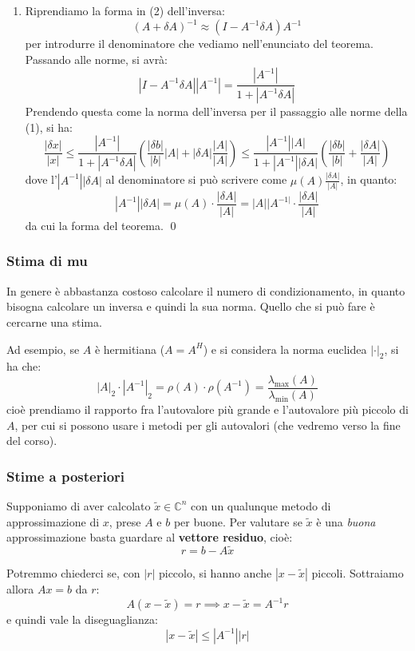 \documentclass[a4paper,11pt]{article}
\begin{document}
\begin{enumerate}
\item 
Riprendiamo la forma in (2) dell'inversa:
$$
(A + \delta A)^{-1} \approx (I - A^{-1} \delta A ) A^{-1} 
$$
per introdurre il denominatore che vediamo nell'enunciato del teorema.
Passando alle norme, si avrà:
$$
|I - A^{-1} \delta A| |A^{-1}| = \frac{|A^{-1}|}{1 + |A^{-1} \delta A|}
$$
Prendendo questa come la norma dell'inversa per il passaggio alle norme della (1), si ha:
$$
\frac{|\delta x|}{|x|} \leq \frac{|A^{-1}|}{1 + |A^{-1} \delta A|} \left( \frac{|\delta b|}{|b|} |A| + |\delta A| \frac{|A|}{|A|} \right) \leq \frac{ |A^{-1}| |A| }{ 1 + |A^{-1}| |\delta A| } \left( \frac{|\delta b|}{|b|} + \frac{|\delta A|}{|A|} \right)
$$
dove l'$|A^{-1}| |\delta A|$ al denominatore si può scrivere come $\mu(A) \frac{|\delta A|}{|A|}$, in quanto:
$$
|A^{-1}| |\delta A| = \mu(A) \cdot \frac{|\delta A|}{|A|} = |A||A^{-1|} \cdot \frac{|\delta A|}{|A|}
$$
da cui la forma del teorema. \qed
\end{enumerate}

\subsubsection{Stima di mu}
In genere è abbastanza costoso calcolare il numero di condizionamento, in quanto bisogna calcolare un inversa e quindi la sua norma.
Quello che si può fare è cercarne una stima.

Ad esempio, se $A$ è hermitiana ($A = A^H$) e si considera la norma euclidea $|\cdot|_2$, si ha che:
$$
|A|_2 \cdot |A^{-1}|_2 = \rho(A) \cdot \rho(A^{-1}) = \frac{\lambda_\text{max}(A)}{\lambda_\text{min}(A)}
$$
cioè prendiamo il rapporto fra l'autovalore più grande e l'autovalore più piccolo di $A$, per cui si possono usare i metodi per gli autovalori (che vedremo verso la fine del corso).

\subsubsection{Stime a posteriori}
Supponiamo di aver calcolato $\tilde{x} \in \mathbb{C}^n$ con un qualunque metodo di approssimazione di $x$, prese $A$ e $b$ per buone.
Per valutare se $\tilde{x}$ è una \textit{buona} approssimazione basta guardare al \textbf{vettore residuo}, cioè:
$$
r = b - A \tilde{x}
$$

Potremmo chiederci se, con $|r|$ piccolo, si hanno anche $|x - \tilde{x}|$ piccoli.
Sottraiamo allora $Ax = b$ da $r$:
$$
A \left( x - \tilde{x} \right) = r \implies x - \tilde{x} = A^{-1} r
$$
e quindi vale la diseguaglianza:
$$
|x - \tilde{x} | \leq |A^{-1}| |r|
$$
\end{document}

